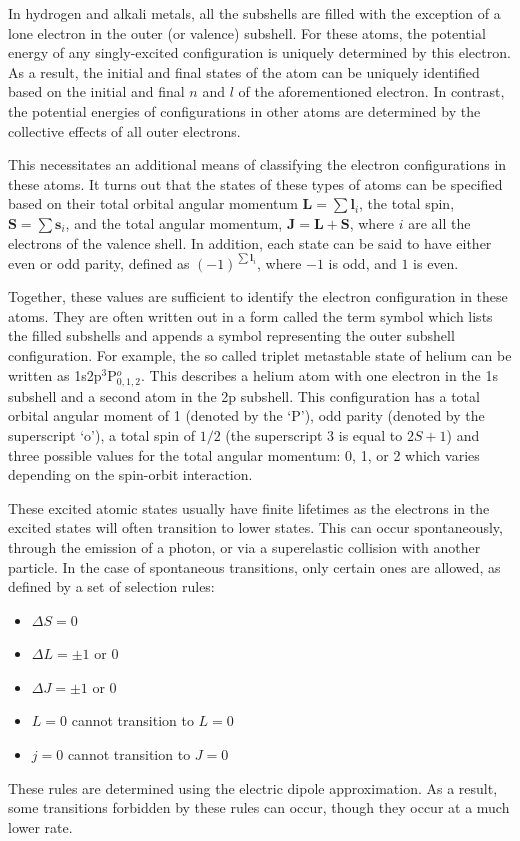 {In hydrogen and alkali metals, all the subshells are filled with the exception
of a lone electron in the outer (or valence) subshell. For these atoms, the
potential energy of any singly-excited configuration is uniquely determined by
this electron. As a result, the initial and final states of the atom can be
uniquely identified based on the initial and final $n$ and $l$ of the
aforementioned electron. In contrast, the potential energies of configurations
in other atoms are determined by the collective effects of all outer electrons.

This necessitates an additional means of classifying the electron configurations
in these atoms. It turns out that the states of these types of atoms can be
specified based on their total orbital angular momentum $\bm{L}=\sum \bm{l}_i$,
the total spin, $\bm{S}=\sum \bm{s}_i$, and the total angular momentum,
$\bm{J}=\bm{L}+\bm{S}$, where $i$ are all the electrons of the valence shell. In
addition, each state can be said to have either even or odd parity, defined as
$(-1)^{\sum\bm{l}_i}$, where $-1$ is odd, and $1$ is even.

Together, these values are sufficient to identify the electron configuration in
these atoms. They are often written out in a form called the term symbol which
lists the filled subshells and appends a symbol representing the outer subshell
configuration. For example, the so called triplet metastable state of helium can
be written as 1s2p$^3$P$^o_{0,1,2}$. This describes a helium atom with one
electron in the 1s subshell and a second atom in the 2p subshell. This
configuration has a total orbital angular moment of 1 (denoted by the `P'), odd
parity (denoted by the superscript `o'), a total spin of $1/2$ (the superscript
$3$ is equal to $2S+1$) and three possible values for the total angular
momentum: 0, 1, or 2 which varies depending on the spin-orbit interaction.

These excited atomic states usually have finite lifetimes as the electrons in
the excited states will often transition to lower states. This can occur
spontaneously, through the emission of a photon, or via a superelastic collision
with another particle. In the case of spontaneous transitions, only certain ones
are allowed, as defined by a set of selection rules:
\begin{itemize}
  \item $\Delta S = 0$
  \item $\Delta L = \pm1$ or 0
  \item $\Delta J = \pm1$ or 0
  \item $L=0$ cannot transition to $L=0$
  \item $j=0$ cannot transition to $J=0$
\end{itemize}
These rules are determined using the electric dipole approximation. As a result,
some transitions forbidden by these rules can occur, though they occur at a much
lower rate.

}
